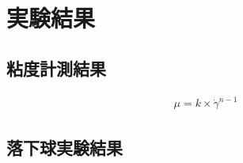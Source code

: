 \chapter{実験結果}
\section{粘度計測結果}
\begin{eqnarray}
    \mu=k\times\dot{\gamma}^{n-1}
\end{eqnarray}
\section{落下球実験結果}